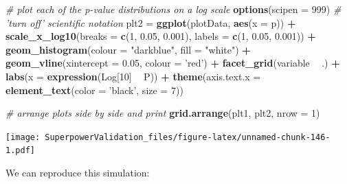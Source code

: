 \documentclass[]{book}
\newenvironment{Shaded}{\begin{snugshade}}{\end{snugshade}}
\newcommand{\CommentTok}[1]{\textcolor[rgb]{0.56,0.35,0.01}{\textit{#1}}}
\newcommand{\DataTypeTok}[1]{\textcolor[rgb]{0.13,0.29,0.53}{#1}}
\newcommand{\DecValTok}[1]{\textcolor[rgb]{0.00,0.00,0.81}{#1}}
\newcommand{\FloatTok}[1]{\textcolor[rgb]{0.00,0.00,0.81}{#1}}
\newcommand{\KeywordTok}[1]{\textcolor[rgb]{0.13,0.29,0.53}{\textbf{#1}}}
\newcommand{\NormalTok}[1]{#1}
\newcommand{\OperatorTok}[1]{\textcolor[rgb]{0.81,0.36,0.00}{\textbf{#1}}}
\newcommand{\StringTok}[1]{\textcolor[rgb]{0.31,0.60,0.02}{#1}}
\begin{document}
\begin{Shaded}
\begin{Highlighting}[]
\CommentTok{# plot each of the p-value distributions on a log scale}
\KeywordTok{options}\NormalTok{(}\DataTypeTok{scipen =} \DecValTok{999}\NormalTok{) }\CommentTok{# 'turn off' scientific notation}
\NormalTok{plt2 =}\StringTok{ }\KeywordTok{ggplot}\NormalTok{(plotData, }\KeywordTok{aes}\NormalTok{(}\DataTypeTok{x =}\NormalTok{ p)) }\OperatorTok{+}
\KeywordTok{scale_x_log10}\NormalTok{(}\DataTypeTok{breaks =} \KeywordTok{c}\NormalTok{(}\DecValTok{1}\NormalTok{, }\FloatTok{0.05}\NormalTok{, }\FloatTok{0.001}\NormalTok{),}
\DataTypeTok{labels =} \KeywordTok{c}\NormalTok{(}\DecValTok{1}\NormalTok{, }\FloatTok{0.05}\NormalTok{, }\FloatTok{0.001}\NormalTok{)) }\OperatorTok{+}
\KeywordTok{geom_histogram}\NormalTok{(}\DataTypeTok{colour =} \StringTok{"darkblue"}\NormalTok{, }\DataTypeTok{fill =} \StringTok{"white"}\NormalTok{) }\OperatorTok{+}
\KeywordTok{geom_vline}\NormalTok{(}\DataTypeTok{xintercept =} \FloatTok{0.05}\NormalTok{, }\DataTypeTok{colour =} \StringTok{'red'}\NormalTok{) }\OperatorTok{+}
\KeywordTok{facet_grid}\NormalTok{(variable }\OperatorTok{~}\StringTok{ }\NormalTok{.) }\OperatorTok{+}
\KeywordTok{labs}\NormalTok{(}\DataTypeTok{x =} \KeywordTok{expression}\NormalTok{(Log[}\DecValTok{10}\NormalTok{] }\OperatorTok{~}\StringTok{ }\NormalTok{P)) }\OperatorTok{+}
\KeywordTok{theme}\NormalTok{(}\DataTypeTok{axis.text.x =} \KeywordTok{element_text}\NormalTok{(}\DataTypeTok{color =} \StringTok{'black'}\NormalTok{, }\DataTypeTok{size =} \DecValTok{7}\NormalTok{))}

\CommentTok{# arrange plots side by side and print}
\KeywordTok{grid.arrange}\NormalTok{(plt1, plt2, }\DataTypeTok{nrow =} \DecValTok{1}\NormalTok{)}
\end{Highlighting}
\end{Shaded}

\texttt{[image: SuperpowerValidation\_files/figure-latex/unnamed-chunk-146-1.pdf]}

We can reproduce this simulation:
\end{document}
